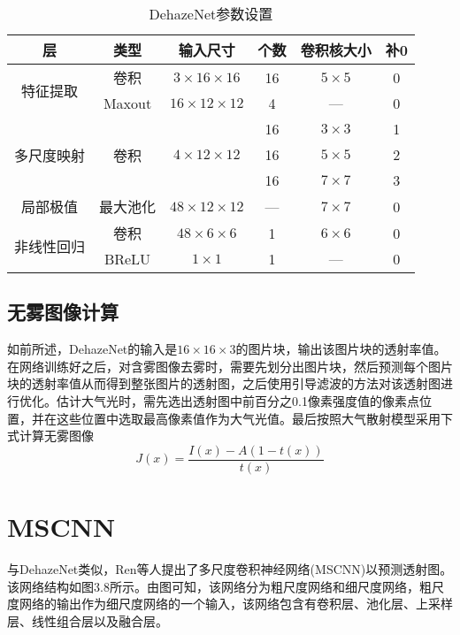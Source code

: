 \documentclass[a4paper, 12pt, oneside]{report}
\begin{document}
{%
\begin{table}[htbp]
  \centering
  \caption{DehazeNet参数设置}
    \begin{tabular}{c|c|c|c|c|c}
    \hline
    层     & 类型    & 输入尺寸  & 个数    & 卷积核大小 & 补0 \\
    \hline
    \multirow{2}[1]{*}{特征提取} & 卷积    & $3 \times 16 \times 16$ & 16    & $5 \times 5$ & 0 \\
          & Maxout & $16 \times 12 \times 12$ & 4     & —     & 0 \\
	\hline
    \multirow{3}[0]{*}{多尺度映射} & \multirow{3}[0]{*}{卷积} & \multirow{3}[0]{*}{$4 \times 12 \times 12$} & 16    & $3 \times 3$ & 1 \\
          &       &       & 16    & $5 \times 5$ & 2 \\
          &       &       & 16    & $7 \times 7$ & 3 \\
	\hline
    局部极值  & 最大池化  & $48 \times 12 \times 12$ & —     & $7 \times 7$ & 0 \\
	\hline
    \multirow{2}[1]{*}{非线性回归} & 卷积    & $48 \times 6 \times 6$ & 1     & $6 \times 6$ & 0 \\
          & BReLU & $1 \times 1$ & 1     & —     & 0 \\
    \hline
    \end{tabular}%
  \label{tab:3.1}%
\end{table}%

\subsection{无雾图像计算\quad}
如前所述，DehazeNet的输入是$16 \times 16 \times 3$的图片块，输出该图片块的透射率值。在网络训练好之后，对含雾图像去雾时，需要先划分出图片块，然后预测每个图片块的透射率值从而得到整张图片的透射图，之后使用引导滤波的方法对该透射图进行优化。估计大气光时，需先选出透射图中前百分之0.1像素强度值的像素点位置，并在这些位置中选取最高像素值作为大气光值。最后按照大气散射模型采用下式计算无雾图像
\begin{equation}
J(x) = \frac{I(x) - A(1 - t(x))}{t(x)}
\end{equation}

\section{MSCNN\quad}
与DehazeNet类似，Ren\cite{ref17}等人提出了多尺度卷积神经网络(MSCNN)以预测透射图。该网络结构如图3.8所示。由图可知，该网络分为粗尺度网络和细尺度网络，粗尺度网络的输出作为细尺度网络的一个输入，该网络包含有卷积层、池化层、上采样层、线性组合层以及融合层。

}
\end{document}
